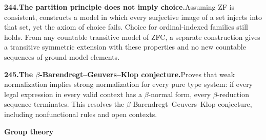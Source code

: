 \documentclass[11pt,a4paper]{article}
\begin{document}
  \par \begin{minipage}{\linewidth}
  \fontsize{10.5}{12.6}\selectfont\RaggedRight
  \hypertarget{result 244}{}
  {\bfseries\textcolor{muted}{244.}\enspace The partition principle does not imply choice.}\enspace Assuming ZF is consistent, constructs a model in which every surjective image of a set injects into that set, yet the axiom of choice fails. Choice for ordinal-indexed families still holds. From any countable transitive model of ZFC, a separate construction gives a transitive symmetric extension with these properties and no new countable sequences of ground-model elements.\par
  \end{minipage}\par\vspace{5pt}



  \par \begin{minipage}{\linewidth}
  \fontsize{10.5}{12.6}\selectfont\RaggedRight
  \hypertarget{result 245}{}
  {\bfseries\textcolor{muted}{245.}\enspace The $\beta$-Barendregt--Geuvers--Klop conjecture.}\enspace Proves that weak normalization implies strong normalization for every pure type system: if every legal expression in every valid context has a $\beta$-normal form, every $\beta$-reduction sequence terminates. This resolves the $\beta$-Barendregt--Geuvers--Klop conjecture, including nonfunctional rules and open contexts.\par
  \end{minipage}\par\vspace{5pt}



  \par{}\addvspace{12pt}
  \hypertarget{subject 5}{}\label{subject 5}
  {\fontsize{15}{18}\selectfont\bfseries Group theory\par}
  \nobreak\vspace{9pt}\nobreak
\end{document}
